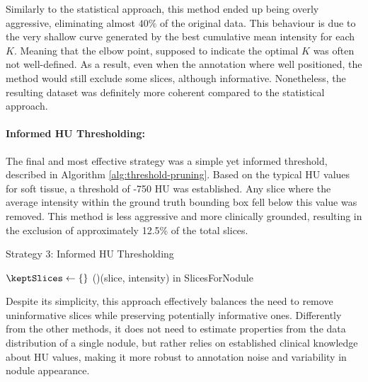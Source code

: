 Similarly to the statistical approach, this method ended up being overly aggressive, eliminating almost $40\%$ of the original data. This behaviour is due to the very shallow curve generated by the best cumulative mean intensity for each $K$. Meaning that the elbow point, supposed to indicate the optimal $K$ was often not well-defined. As a result, even when the annotation where well positioned, the method would still exclude some slices, although informative.
Nonetheless, the resulting dataset was definitely more coherent compared to the statistical approach.

\paragraph{Informed HU Thresholding:} The final and most effective strategy was a simple yet informed threshold, described in Algorithm \ref{alg:threshold-pruning}. Based on the typical HU values for soft tissue, a threshold of -750 HU was established. Any slice where the average intensity within the ground truth bounding box fell below this value was removed. This method is less aggressive and more clinically grounded, resulting in the exclusion of approximately 12.5\% of the total slices.

\begin{algorithm}[H]
    \caption{Strategy 3: Informed HU Thresholding}
    \label{alg:threshold-pruning}
    \DontPrintSemicolon
    \SetAlgoLined

    
    \BlankLine
    
    $\keptSlices \gets \{\}$\;
    \ForAll(){(slice, intensity) \textup{in} SlicesForNodule}{
    }
    \Return{$\keptSlices$}\;
\end{algorithm}

Despite its simplicity, this approach effectively balances the need to remove uninformative slices while preserving potentially informative ones.
Differently from the other methods, it does not need to estimate properties from the data distribution of a single nodule, but rather relies on established clinical knowledge about HU values, making it more robust to annotation noise and variability in nodule appearance.

